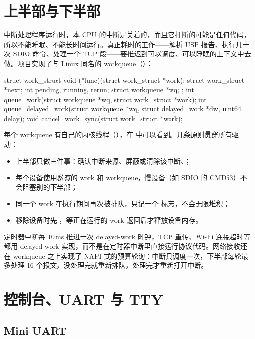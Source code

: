 \section{上半部与下半部}

中断处理程序运行时，本 CPU 的中断是关着的，而且它打断的可能是任何代码，所以不能睡眠、不能长时间运行。真正耗时的工作——解析 USB 报告、执行几十次 SDIO 命令、处理一个 TCP 段——要推迟到可以调度、可以睡眠的上下文中去做。项目实现了与 Linux 同名的 workqueue（）：

\begin{ccode}
struct work_struct {
  void (*func)(struct work_struct *work);
  struct work_struct *next;
  int pending, running, rerun;
  struct workqueue *wq;
};
int  queue_work(struct workqueue *wq, struct work_struct *work);
int  queue_delayed_work(struct workqueue *wq, struct delayed_work *dw, uint64 delay);
void cancel_work_sync(struct work_struct *work);
\end{ccode}

每个 workqueue 有自己的内核线程（），在  中可以看到。几条原则贯穿所有驱动：

\begin{itemize}
  \item 上半部只做三件事：确认中断来源、屏蔽或清除该中断、；
  \item 每个设备使用\emph{私有}的 work 和 workqueue，慢设备（如 SDIO 的 CMD53）不会阻塞别的下半部；
  \item 同一个 work 在执行期间再次被排队，只记一个  标志，不会无限堆积；
  \item 移除设备时先 ，等正在运行的 work 返回后才释放设备内存。
\end{itemize}

定时器中断每 10\,ms 推进一次 delayed-work 时钟，TCP 重传、Wi-Fi 连接超时等都用 delayed work 实现，而不是在定时器中断里直接运行协议代码。网络接收还在 workqueue 之上实现了 NAPI 式的预算轮询：中断只调度一次，下半部每轮最多处理 16 个报文，没处理完就重新排队，处理完才重新打开中断。

\section{控制台、UART 与 TTY}

\subsection{Mini UART}

